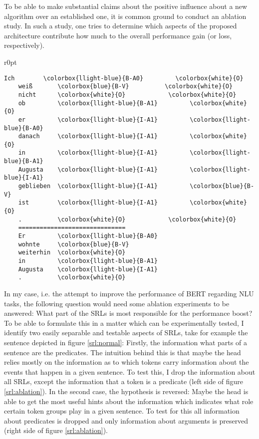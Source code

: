 {To be able to make substantial claims about the positive influence about a new algorithm over an
established one, it is common ground to conduct an ablation study. In such a study, one tries to
determine which aspects of the proposed architecture contribute how much to the overall performance
gain (or loss, respectively).

\begin{wrapfigure}[16]{r}{0pt}
\begin{minipage}{0.45\linewidth}
  \centering
    \begin{srl}
      \begin{BVerbatim}[commandchars=\\\{\}, fontsize=\footnotesize]
    Ich        \colorbox{llight-blue}{B-A0}         \colorbox{white}{O}
    weiß       \colorbox{blue}{B-V}          \colorbox{white}{O}
    nicht      \colorbox{white}{O}            \colorbox{white}{O}
    ob         \colorbox{llight-blue}{B-A1}         \colorbox{white}{O}
    er         \colorbox{llight-blue}{I-A1}         \colorbox{llight-blue}{B-A0}
    danach     \colorbox{llight-blue}{I-A1}         \colorbox{white}{O}
    in         \colorbox{llight-blue}{I-A1}         \colorbox{llight-blue}{B-A1}
    Augusta    \colorbox{llight-blue}{I-A1}         \colorbox{llight-blue}{I-A1}
    geblieben  \colorbox{llight-blue}{I-A1}         \colorbox{blue}{B-V}
    ist        \colorbox{llight-blue}{I-A1}         \colorbox{white}{O}
    .          \colorbox{white}{O}            \colorbox{white}{O}
    ==============================
    Er         \colorbox{llight-blue}{B-A0}
    wohnte     \colorbox{blue}{B-V}
    weiterhin  \colorbox{white}{O}
    in         \colorbox{llight-blue}{B-A1}
    Augusta    \colorbox{llight-blue}{I-A1}
    .          \colorbox{white}{O}
      \end{BVerbatim}
      \caption{Regular SRLs.}
      \label{srl:normal}
    \end{srl}
\end{minipage}
\end{wrapfigure}

In my case, i.e. the attempt to improve the performance of BERT regarding NLU tasks, the
following question would need some ablation experiments to be answered: What part of the SRLs
is most responsible for the performance boost? To be able to formulate this in a matter which
can be experimentally tested, I identify two easily separable and testable aspects of SRLs,
take for example the sentence depicted in figure \ref{srl:normal}: Firstly, the information
what parts of a sentence are the predicates. The intuition behind this is that maybe the
head relies mostly on the information as to which tokens carry information about the events
that happen in a given sentence. To test this, I drop the information about all SRLs,
except the information that a token is a predicate (left side of figure \ref{srl:ablation}).
In the second case, the hypothesis is reversed: Maybe the head is able to get the most useful
hints about the information which indicates what role certain token groups play in a given
sentence. To test for this all information about predicates is dropped and only information
about arguments is preserved (right side of figure \ref{srl:ablation}).

}
